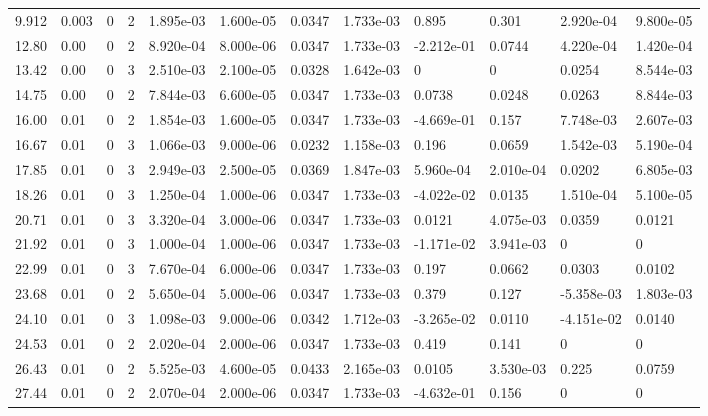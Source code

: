 \documentclass[preview]{standalone}
\begin{document}
{{\begin{tabular}{L{1.2cm}C{1.2cm} C{0.3cm}C{0.5cm} C{1.4cm}C{1.4cm} C{1.4cm}C{1.4cm} C{1.6cm}C{1.6cm} C{1.6cm}C{1.6cm}}
  9.912  &  0.003  & 0     &  2 &  1.895e-03  & 1.600e-05  &  0.0347&   1.733e-03& 0.895 & 0.301   &  2.920e-04 & 9.800e-05  \\ 
  12.80  &  0.00  & 0     &  2 &  8.920e-04  & 8.000e-06  &  0.0347&   1.733e-03& -2.212e-01 & 0.0744   &  4.220e-04 & 1.420e-04  \\ 
  13.42  &  0.00  & 0     &  3 &  2.510e-03  & 2.100e-05  &  0.0328&   1.642e-03& 0 & 0   &  0.0254 & 8.544e-03  \\ 
  14.75  &  0.00  & 0     &  2 &  7.844e-03  & 6.600e-05  &  0.0347&   1.733e-03& 0.0738 & 0.0248   &  0.0263 & 8.844e-03  \\ 
  16.00  &  0.01  & 0     &  2 &  1.854e-03  & 1.600e-05  &  0.0347&   1.733e-03& -4.669e-01 & 0.157   &  7.748e-03 & 2.607e-03  \\ 
  16.67  &  0.01  & 0     &  3 &  1.066e-03  & 9.000e-06  &  0.0232&   1.158e-03& 0.196 & 0.0659   &  1.542e-03 & 5.190e-04  \\ 
  17.85  &  0.01  & 0     &  3 &  2.949e-03  & 2.500e-05  &  0.0369&   1.847e-03& 5.960e-04 & 2.010e-04   &  0.0202 & 6.805e-03  \\ 
  18.26  &  0.01  & 0     &  3 &  1.250e-04  & 1.000e-06  &  0.0347&   1.733e-03& -4.022e-02 & 0.0135   &  1.510e-04 & 5.100e-05  \\ 
  20.71  &  0.01  & 0     &  3 &  3.320e-04  & 3.000e-06  &  0.0347&   1.733e-03& 0.0121 & 4.075e-03   &  0.0359 & 0.0121  \\ 
  21.92  &  0.01  & 0     &  3 &  1.000e-04  & 1.000e-06  &  0.0347&   1.733e-03& -1.171e-02 & 3.941e-03   &  0 & 0  \\ 
  22.99  &  0.01  & 0     &  3 &  7.670e-04  & 6.000e-06  &  0.0347&   1.733e-03& 0.197 & 0.0662   &  0.0303 & 0.0102  \\ 
  23.68  &  0.01  & 0     &  2 &  5.650e-04  & 5.000e-06  &  0.0347&   1.733e-03& 0.379 & 0.127   &  -5.358e-03 & 1.803e-03  \\ 
  24.10  &  0.01  & 0     &  3 &  1.098e-03  & 9.000e-06  &  0.0342&   1.712e-03& -3.265e-02 & 0.0110   &  -4.151e-02 & 0.0140  \\ 
  24.53  &  0.01  & 0     &  2 &  2.020e-04  & 2.000e-06  &  0.0347&   1.733e-03& 0.419 & 0.141   &  0 & 0  \\ 
  26.43  &  0.01  & 0     &  2 &  5.525e-03  & 4.600e-05  &  0.0433&   2.165e-03& 0.0105 & 3.530e-03   &  0.225 & 0.0759  \\ 
  27.44  &  0.01  & 0     &  2 &  2.070e-04  & 2.000e-06  &  0.0347&   1.733e-03& -4.632e-01 & 0.156   &  0 & 0  \\ 

\end{tabular}}}
\end{document}
